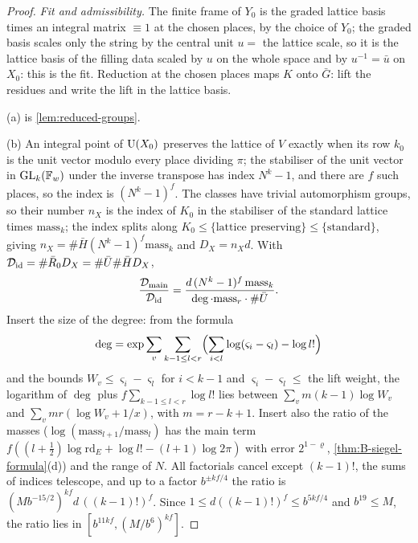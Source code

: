 \begin{proof}
\emph{Fit and admissibility.} The finite frame of $Y_0$ is the graded lattice basis times an integral matrix $\equiv1$ at the chosen places, by the choice of $Y_0$; the graded basis scales only the string by the central unit $u=$ the lattice scale, so it is the
lattice basis of the filling data scaled by $u$ on the whole space and by $u^{-1}=\bar u$ on $X_0$: this is the fit. Reduction at the chosen places maps $K$ onto $\bar G$: lift the residues and write the lift in the lattice basis.

(a) is \cref{lem:reduced-groups}.

(b) An integral point of $\operatorname{U}(X_0)$ preserves the lattice of $V$ exactly when its row $k_0$ is the unit vector modulo every place dividing $\pi$; the stabiliser of the unit vector in $\operatorname{GL}_k(\mathbb{F}_w)$ under the inverse transpose has index $N^k-1$, and there are $f$ such places, so the
index is $(N^k-1)^f$. The classes have trivial automorphism groups, so their number $n_X$ is the index of $K_0$ in the stabiliser of the standard lattice times $\mathrm{mass}_k$; the index splits along $K_0\le\{\text{lattice preserving}\}\le\{\text{standard}\}$, giving
$n_X=\#\bar H(N^k-1)^f\mathrm{mass}_k$ and $D_X=n_Xd$. With $\mathcal D_{\rm id}=\#\bar R_0D_X=\#\bar U\#\bar H D_X$,
\[
  \frac{\mathcal D_{\rm main}}{\mathcal D_{\rm id}}=\frac{d\,(N^k-1)^f\,\mathrm{mass}_k}{\deg\cdot\mathrm{mass}_r\cdot\#\bar U}.
\]
Insert the size of the degree: from the formula
\[
  \deg=\exp\sum_{v}\sum_{k-1\le l<r}\Bigl(\sum_{i<l}\log(\varsigma_i-\varsigma_l)-\log l!\Bigr)
\]
and the bounds $W_v\le\varsigma_i-\varsigma_l$ for $i<k-1$ and $\varsigma_i-\varsigma_l\le$ the lift weight, the logarithm of $\deg$ plus $f\sum_{k-1\le l<r}\log l!$ lies between $\sum_vm(k-1)\log W_v$ and $\sum_vmr(\log W_v+1/x)$, with $m=r-k+1$. Insert also the
ratio of the masses ($\log(\mathrm{mass}_{l+1}/\mathrm{mass}_l)$ has the main term $f((l+\frac12)\log\mathrm{rd}_E+\log l!-(l+1)\log2\pi)$ with error $2^{1-\varrho}$, \cref{thm:B-siegel-formula}(d)) and the range of $N$. All factorials cancel except $(k-1)!$, the sums of indices
telescope, and up to a factor $b^{\pm kf/4}$ the ratio is $(Mb^{-15/2})^{kf}d\,((k-1)!)^f$. Since $1\le d((k-1)!)^f\le b^{5kf/4}$ and $b^{19}\le M$, the ratio lies in $[b^{11kf},(M/b^6)^{kf}]$.


\end{proof}
